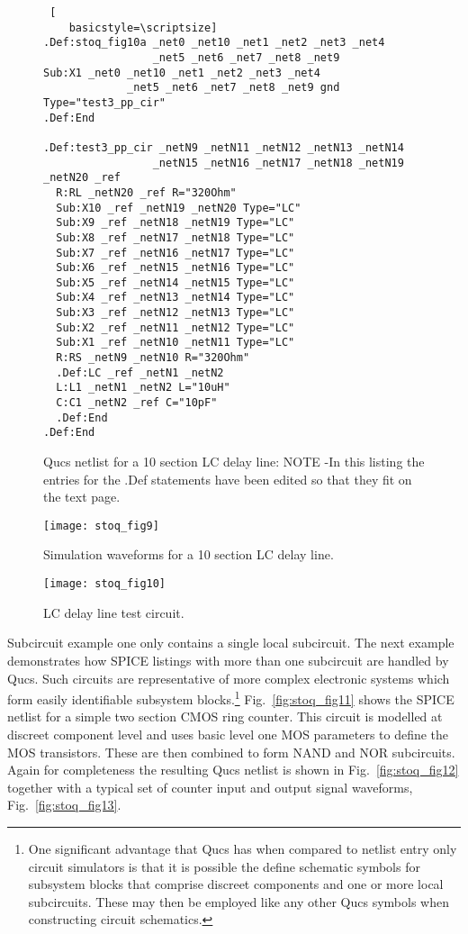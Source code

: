 \begin{figure}
 \begin{lstlisting} [
    basicstyle=\scriptsize]
.Def:stoq_fig10a _net0 _net10 _net1 _net2 _net3 _net4 
                 _net5 _net6 _net7 _net8 _net9
Sub:X1 _net0 _net10 _net1 _net2 _net3 _net4 
             _net5 _net6 _net7 _net8 _net9 gnd Type="test3_pp_cir"
.Def:End

.Def:test3_pp_cir _netN9 _netN11 _netN12 _netN13 _netN14 
                 _netN15 _netN16 _netN17 _netN18 _netN19 _netN20 _ref
  R:RL _netN20 _ref R="320Ohm"
  Sub:X10 _ref _netN19 _netN20 Type="LC"
  Sub:X9 _ref _netN18 _netN19 Type="LC"
  Sub:X8 _ref _netN17 _netN18 Type="LC"
  Sub:X7 _ref _netN16 _netN17 Type="LC"
  Sub:X6 _ref _netN15 _netN16 Type="LC"
  Sub:X5 _ref _netN14 _netN15 Type="LC"
  Sub:X4 _ref _netN13 _netN14 Type="LC"
  Sub:X3 _ref _netN12 _netN13 Type="LC"
  Sub:X2 _ref _netN11 _netN12 Type="LC"
  Sub:X1 _ref _netN10 _netN11 Type="LC"
  R:RS _netN9 _netN10 R="320Ohm"
  .Def:LC _ref _netN1 _netN2
  L:L1 _netN1 _netN2 L="10uH"
  C:C1 _netN2 _ref C="10pF"
  .Def:End
.Def:End
\end{lstlisting} 
  \caption{Qucs netlist for a 10 section LC delay line: NOTE -In this listing the entries for the .Def statements have been edited so that they fit on the text page.}
  \label{fig:stoq_fig8}
\end{figure} 

\begin{figure}
  \centering
  \texttt{[image: stoq\_fig9]}
  \caption{Simulation waveforms for a 10 section LC delay line.}
  \label{fig:stoq_fig9}
\end{figure} 

\begin{figure}
  \centering
  \texttt{[image: stoq\_fig10]}
  \caption{LC delay line test circuit.}
  \label{fig:stoq_fig10}
\end{figure} 

Subcircuit example one only contains a single local subcircuit. The next example demonstrates how SPICE listings with more than one subcircuit are handled by Qucs.  Such circuits are representative of more complex electronic systems which form easily identifiable subsystem blocks.\footnote{One significant advantage that Qucs has when compared to netlist entry only circuit simulators is that it is possible the define schematic symbols for subsystem blocks that comprise discreet components and one or more local subcircuits. These may then be employed like any other Qucs symbols when constructing circuit schematics.} Fig.~\ref{fig:stoq_fig11} shows the SPICE netlist for a simple two section CMOS ring counter. This circuit is modelled at discreet component level and uses basic level one MOS parameters to define the MOS transistors. These are then combined to form NAND and NOR subcircuits. Again for completeness the resulting Qucs netlist is shown in Fig.~\ref{fig:stoq_fig12} together with a typical set of counter input and output signal waveforms, Fig.~\ref{fig:stoq_fig13}.

